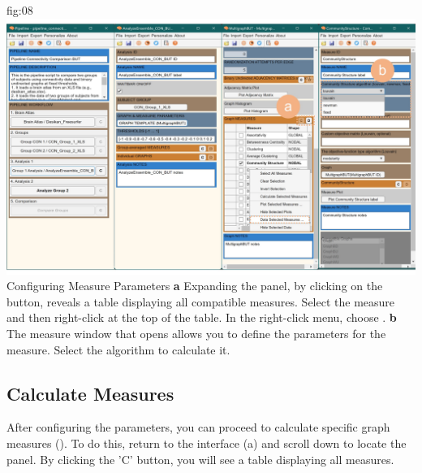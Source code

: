 \documentclass[justified]{tufte-handout}
\begin{document}
{fig:08}
{
	\includegraphics{fig08.jpg}
}
{Configuring Measure Parameters}
{
	{\bf a} Expanding the  panel, by clicking on the  button, reveals a table displaying all compatible measures. 
	Select the  measure and then right-click at the top of the table. In the right-click menu, choose .
	{\bf b} The measure window that opens allows you to define the parameters for the  measure. Select the  algorithm to calculate it.
}


\clearpage
\subsection{Calculate Measures}
 
After configuring the parameters, you can proceed to calculate specific graph measures (). To do this, return to the  interface (a) and scroll down to locate the  panel. By clicking the 'C' button, you will see a table displaying all measures.
\end{document}
